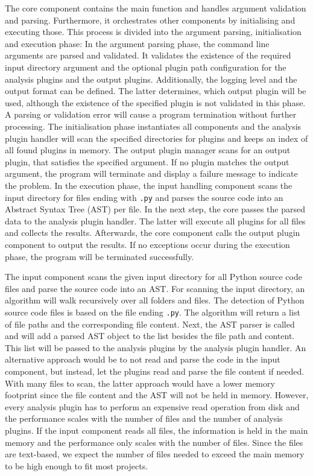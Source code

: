 The core component contains the main function and handles argument validation and parsing. Furthermore, it orchestrates other components by initialising and executing those. This process is divided into the argument parsing, initialisation and execution phase:
In the argument parsing phase, the command line arguments are parsed and validated. It validates the existence of the required input directory argument and the optional plugin path configuration for the analysis plugins and the output plugins. Additionally, the logging level and the output format can be defined. The latter determines, which output plugin will be used, although the existence of the specified plugin is not validated in this phase. A parsing or validation error will cause a program termination without further processing.
The initialisation phase instantiates all components and the analysis plugin handler will scan the specified directories for plugins and keeps an index of all found plugins in memory. The output plugin manager scans for an output plugin, that satisfies the specified argument. If no plugin matches the output argument, the program will terminate and display a failure message to indicate the problem.
In the execution phase, the input handling component scans the input directory for files ending with \texttt{.py} and parses the source code into an Abstract Syntax Tree (AST) per file. In the next step, the core passes the parsed data to the analysis plugin handler. The latter will execute all plugins for all files and collects the results. Afterwards, the core component calls the output plugin component to output the results. If no exceptions occur during the execution phase, the program will be terminated successfully.

The input component scans the given input directory for all Python source code files and parse the source code into an AST. 
For scanning the input directory, an algorithm will walk recursively over all folders and files. The detection of Python source code files is based on the file ending \texttt{.py}. The algorithm will return a list of file paths and the corresponding file content. 
Next, the AST parser is called and will add a parsed AST object to the list besides the file path and content. This list will be passed to the analysis plugins by the analysis plugin handler.  An alternative approach would be to not read and parse the code in the input component, but instead, let the plugins read and parse the file content if needed. With many files to scan, the latter approach would have a lower memory footprint since the file content and the AST will not be held in memory. However, every analysis plugin has to perform an expensive read operation from disk and the performance scales with the number of files and the number of analysis plugins. 
If the input component reads all files, the information is held in the main memory and the performance only scales with the number of files. Since the files are text-based, we expect the number of files needed to exceed the main memory to be high enough to fit most projects.

